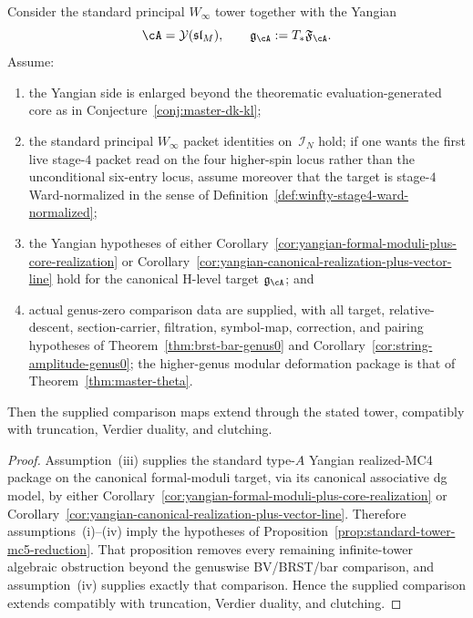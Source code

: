 \begin{corollary}
\label{cor:standard-tower-mc5-closure}
Consider the standard principal
\texorpdfstring{$W_\infty$}{W_infty} tower together with the Yangian
\[
\cA=\mathcal{Y}(\mathfrak{sl}_M),
\qquad
\mathfrak{g}_{\cA}:=T_*\mathfrak{F}_{\cA}.
\]
Assume:
\begin{enumerate}[label=\textup{(\roman*)}]
\item the Yangian side is enlarged beyond the theorematic
  evaluation-generated core as in
  Conjecture~\ref{conj:master-dk-kl};
\item the standard principal \texorpdfstring{$W_\infty$}{W_infty}
  packet identities on~$\mathcal{I}_N$ hold; if one wants the first
  live stage-$4$ packet read on the four higher-spin locus rather than
  the unconditional six-entry locus, assume moreover that the target is
  stage-$4$ Ward-normalized in the sense of
  Definition~\ref{def:winfty-stage4-ward-normalized};
\item the Yangian hypotheses of
  either Corollary~\ref{cor:yangian-formal-moduli-plus-core-realization}
  or Corollary~\ref{cor:yangian-canonical-realization-plus-vector-line}
  hold for the canonical H-level target $\mathfrak{g}_{\cA}$; and
\item actual genus-zero comparison data are supplied, with all target, relative-descent, section-carrier, filtration, symbol-map, correction, and pairing hypotheses of Theorem~\ref{thm:brst-bar-genus0} and Corollary~\ref{cor:string-amplitude-genus0};
  the higher-genus modular deformation package is that of Theorem~\ref{thm:master-theta}.
\end{enumerate}
Then the supplied comparison maps extend through the stated tower, compatibly with truncation, Verdier duality, and clutching.
\end{corollary}

\begin{proof}
Assumption~\textup{(iii)} supplies the standard type-$A$ Yangian
realized-MC4 package on the canonical formal-moduli target, via its
canonical associative dg model, by either
Corollary~\ref{cor:yangian-formal-moduli-plus-core-realization} or
Corollary~\ref{cor:yangian-canonical-realization-plus-vector-line}.
Therefore assumptions~\textup{(i)}--\textup{(iv)} imply the hypotheses
of Proposition~\ref{prop:standard-tower-mc5-reduction}.  That
proposition removes every remaining infinite-tower algebraic
obstruction beyond the genuswise BV/BRST/bar comparison, and
assumption~\textup{(iv)} supplies exactly that comparison.  Hence the
supplied comparison extends compatibly with truncation, Verdier duality, and clutching.
\end{proof}

